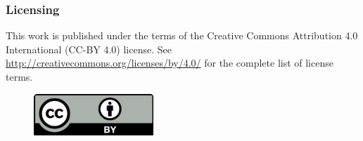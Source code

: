 \subsubsection*{Licensing}
This work is published under the terms of the Creative Commons Attribution 4.0 International (CC-BY 4.0) license. See \url{http://creativecommons.org/licenses/by/4.0/} for the complete list of license terms.
\begin{figure}
\centering\includegraphics[width=0.4\textwidth]{figures/cc-by.pdf}
\end{figure}
